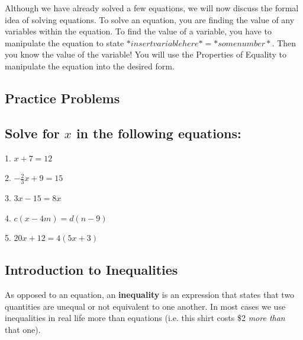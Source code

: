 Although we have already solved a few equations, we will now discuss the formal idea of
solving equations. To solve an equation, you are finding the value of any variables within
the equation. To find the value of a variable, you have to manipulate the equation to
state $*insert variable here* = *some number*$. Then you know the value of the variable!
You will use the Properties of Equality to manipulate the equation into the desired form.




\subsection{Practice Problems}
\label{sss:prac-fe87}





\subsection{Solve for \( x \) in the following equations:}
\label{sss:solv-bfc3}




1. $x + 7 = 12$



2. $-\frac{2}{3}x + 9 = 15$



3. $3x - 15 = 8x$



4. $c(x - 4m) = d(n - 9)$



5. $20x + 12 = 4(5x + 3)$




\subsection{Introduction to Inequalities}
\label{sss:intr-60f5}




As opposed to an equation, an \textbf{inequality} is an expression that states that two
quantities are unequal or not equivalent to one another. In most cases we use inequalities
in real life more than equations (i.e. this shirt costs \$2 \textit{more than} that one).



